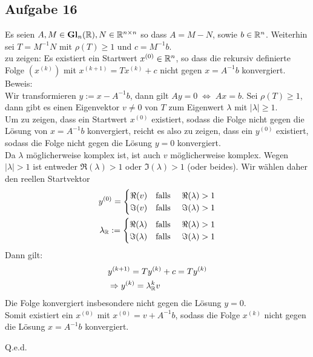 \subsection*{Aufgabe 16}

Es seien $A,M \in \mathbf{Gl}_n(\mathbb R), N \in \mathbb R^{n\times n}$ so dass $A=M-N$, sowie $b \in \mathbb R^n$. Weiterhin sei $T=M^{-1}N$ mit $\rho(T)\ge 1$ und $c=M^{-1}b$.\\
zu zeigen: Es existiert ein Startwert $x^{(0)} \in \mathbb R^n$, so dass die rekursiv definierte Folge $(x^{(k)})$ mit $x^{(k+1)}=Tx^{(k)}+c$ nicht gegen $x=A^{-1}b$ konvergiert.\\
\newline
Beweis:\\
Wir transformieren $y := x - A^{-1} b$, dann gilt $A y = 0 \; \Leftrightarrow \; A x = b$.
Sei $\rho(T)\ge 1$, dann gibt es einen Eigenvektor $v \neq 0$ von $T$ zum Eigenwert $\lambda$ mit $|\lambda|\ge 1$.\\
\newline
Um zu zeigen, dass ein Startwert $x^{(0)}$ existiert, sodass die Folge nicht gegen die Lösung von $x=A^{-1}b$ konvergiert, reicht es also zu zeigen, dass ein $y^{(0)}$ existiert, sodass die Folge nicht gegen die Lösung $y=0$ konvergiert.\\
\newline
Da $\lambda$ möglicherweise komplex ist, ist auch $v$ möglicherweise komplex. Wegen
$|\lambda| > 1$ ist entweder $\Re(\lambda) > 1$ oder $\Im(\lambda) > 1$ (oder beides).
Wir wählen daher den reellen Startvektor
\begin{align*}
  y^{(0)} = \begin{cases}
             \Re(v) \quad \text{falls } &\Re(\lambda) > 1\\
             \Im(v) \quad \text{falls } &\Im(\lambda) > 1\\
           \end{cases} \\
  \lambda_\mathbb R := \begin{cases}
             \Re(\lambda) \quad \text{falls } &\Re(\lambda) > 1\\
             \Im(\lambda) \quad \text{falls } &\Im(\lambda) > 1\\
           \end{cases}
\end{align*}
Dann gilt:
\begin{align*}
&y^{(k+1)}=Ty^{(k)}+ {c}=Ty^{(k)}\\
&\Rightarrow y^{(k)}=\lambda_\mathbb R^kv
\end{align*}
Die Folge konvergiert insbesondere nicht gegen die Lösung $y = 0$.\\
Somit existiert ein $x^{(0)}$ mit $x^{(0)}=v+A^{-1}b$, sodass die Folge $x^{(k)}$ nicht gegen die Lösung $x=A^{-1}b$ konvergiert.
\begin{flushright}
Q.e.d.
\end{flushright}
